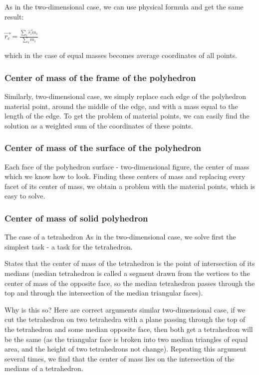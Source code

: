 As in the two-dimensional case, we can use physical formula and get the same result:

$\vec{r_{c}}=\frac{\sum_{i}\vec{r_{i}}m_{i}}{\sum_{i}m_{i}}$

which in the case of equal masses becomes average coordinates of all points.

\subsubsection{ Center of mass of the frame of the polyhedron }

Similarly, two-dimensional case, we simply replace each edge of the polyhedron material point, around the middle of the edge, and with a mass equal to the length of the edge. To get the problem of material points, we can easily find the solution as a weighted sum of the coordinates of these points.

\subsubsection{ Center of mass of the surface of the polyhedron }

Each face of the polyhedron surface - two-dimensional figure, the center of mass which we know how to look. Finding these centers of mass and replacing every facet of its center of mass, we obtain a problem with the material points, which is easy to solve.

\subsubsection{ Center of mass of solid polyhedron }

The case of a tetrahedron
As in the two-dimensional case, we solve first the simplest task - a task for the tetrahedron.

States that the center of mass of the tetrahedron is the point of intersection of its medians (median tetrahedron is called a segment drawn from the vertices to the center of mass of the opposite face, so the median tetrahedron passes through the top and through the intersection of the median triangular faces).

Why is this so? Here are correct arguments similar two-dimensional case, if we cut the tetrahedron on two tetrahedra with a plane passing through the top of the tetrahedron and some median opposite face, then both get a tetrahedron will be the same (as the triangular face is broken into two median triangles of equal area, and the height of two tetrahedrons not change). Repeating this argument several times, we find that the center of mass lies on the intersection of the medians of a tetrahedron.

